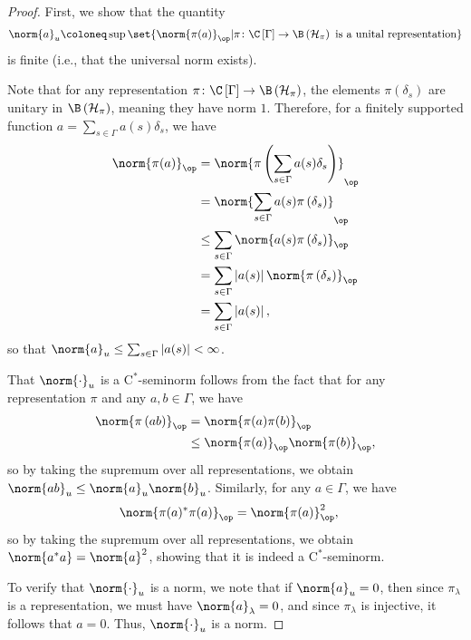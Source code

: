 \begin{proof}
  First, we show that the quantity
  \begin{align*}
    \norm{a}_{u}\coloneq \sup\set{\norm{\pi(a)}_{\op} | \pi\colon \C\left[ \Gamma \right]\rightarrow \B\left( \mathcal{H}_{\pi} \right)\text{ is a unital representation}}
  \end{align*}
  is finite (i.e., that the universal norm exists).\newline

  Note that for any representation $\pi\colon \C\left[ \Gamma \right]\rightarrow \B\left( \mathcal{H}_{\pi} \right)$, the elements $\pi\left( \delta_s \right)$ are unitary in $\B\left( \mathcal{H}_{\pi} \right)$, meaning they have norm $1$. Therefore, for a finitely supported function $a = \sum_{s\in\Gamma}a(s)\delta_s$, we have
  \begin{align*}
    \norm{\pi(a)}_{\op} &= \norm{\pi\left( \sum_{s\in\Gamma}a(s)\delta_s \right)}_{\op}\\
                        &= \norm{\sum_{s\in\Gamma}a(s)\pi\left( \delta_s \right)}_{\op}\\
                        &\leq \sum_{s\in\Gamma}\norm{a(s)\pi\left( \delta_s \right)}_{\op}\\
                        &= \sum_{s\in\Gamma}\left\vert a(s) \right\vert\norm{\pi\left( \delta_s \right)}_{\op}\\
                        &= \sum_{s\in\Gamma}\left\vert a(s) \right\vert,
  \end{align*}
  so that $\norm{a}_u\leq \sum_{s\in\Gamma}\left\vert a(s) \right\vert < \infty$.\newline

  That $\norm{\cdot}_{u}$ is a $\mathrm{C}^{\ast}$-seminorm follows from the fact that for any representation $\pi$ and any $a,b\in \Gamma$, we have
  \begin{align*}
    \norm{\pi\left( ab \right)}_{\op} &= \norm{\pi(a)\pi(b)}_{\op}\\
                                      &\leq \norm{\pi(a)}_{\op}\norm{\pi(b)}_{\op},
  \end{align*}
  so by taking the supremum over all representations, we obtain $\norm{ab}_{u}\leq \norm{a}_{u}\norm{b}_{u}$. Similarly, for any $a\in\Gamma$, we have
  \begin{align*}
    \norm{\pi(a)^{\ast}\pi(a)}_{\op} &= \norm{\pi(a)}_{\op}^2,
  \end{align*}
  so by taking the supremum over all representations, we obtain $\norm{a^{\ast}a} = \norm{a}^2$, showing that it is indeed a $\mathrm{C}^{\ast}$-seminorm.\newline

  To verify that $\norm{\cdot}_u$ is a norm, we note that if $\norm{a}_{u} = 0$, then since $\pi_{\lambda}$ is a representation, we must have $\norm{a}_{\lambda} = 0$, and since $\pi_{\lambda}$ is injective, it follows that $a = 0$. Thus, $\norm{\cdot}_u$ is a norm.
\end{proof}
